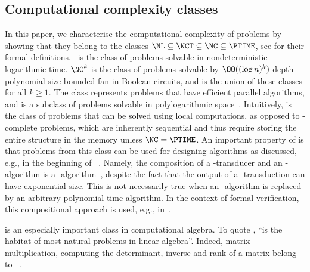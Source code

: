 \subsection{Computational complexity classes} 
In this paper, we characterise the computational complexity of problems by showing that they belong to the classes $\NL \subseteq \NCT \subseteq \NC \subseteq \PTIME$, see \cite{Arora2009, Goldreich2008} for their formal definitions. \NL~is the class of problems solvable in nondeterministic logarithmic time. $\NC^k$ is the class of problems solvable by $\OO((\log n)^k)$-depth polynomial-size bounded fan-in Boolean circuits, and \NC is the union of these classes for all $k \ge 1$.
The class \NC represents problems that have efficient parallel algorithms, and is a subclass of problems solvable in polylogarithmic space~\cite{Arora2009}. Intuitively, \NC is the class of problems that can be solved using local computations, as opposed to \PTIME-complete problems, which are inherently sequential and thus require storing the entire structure in the memory unless $\NC = \PTIME$. An important property of \NC is that problems from this class can be used for designing \PSPACE algorithms as discussed, e.g., in the beginning of ~\cite[Section 3]{Jain2011}. Namely, the  composition of a \PSPACE-transducer and an \NC-algorithm is a \PSPACE-algorithm~\cite{Borodin1977}, despite the fact that the output of a \PSPACE-transduction can have exponential size. This is not necessarily true when an \NC-algorithm is replaced by an arbitrary polynomial time algorithm. In the context of formal verification, this compositional approach is used, e.g., in~\cite{Baier2023}.


\enlargethispage{2\baselineskip}
\NCT is an especially important class in computational algebra.
To quote \cite[page 468]{Goldreich2008}, ``\NCT is the habitat of most natural problems in linear algebra''. Indeed, matrix multiplication, computing the determinant, inverse and rank of a matrix belong to \NCT~\cite{BorodinGH82,Cook85,Berkowitz1984,Csanky1976}.

